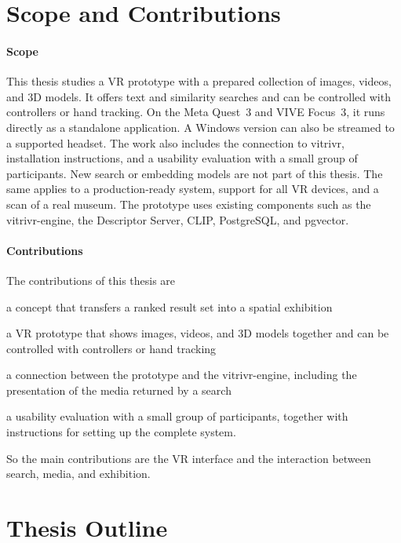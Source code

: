 \section{Scope and Contributions}
\label{sec:introduction-scope}

\paragraph{Scope} This thesis studies a VR prototype with a prepared collection of images, videos, and 3D models. It offers text and similarity searches and can be controlled with controllers or hand tracking. On the Meta Quest~3 and VIVE Focus~3, it runs directly as a standalone application. A Windows version can also be streamed to a supported headset. The work also includes the connection to vitrivr, installation instructions, and a usability evaluation with a small group of participants. New search or embedding models are not part of this thesis. The same applies to a production-ready system, support for all VR devices, and a scan of a real museum. The prototype uses existing components such as the vitrivr-engine, the Descriptor Server, CLIP, PostgreSQL, and pgvector.

\pagebreak
\paragraph{Contributions} The contributions of this thesis are
\begin{enumerate*}[label=(\roman*), itemjoin={{, }}, itemjoin*={{, and }}]
  \item a concept that transfers a ranked result set into a spatial exhibition
  \item a VR prototype that shows images, videos, and 3D models together and can be controlled with controllers or hand tracking
  \item a connection between the prototype and the vitrivr-engine, including the presentation of the media returned by a search
  \item a usability evaluation with a small group of participants, together with instructions for setting up the complete system.
\end{enumerate*}

So the main contributions are the VR interface and the interaction between search, media, and exhibition.

\section{Thesis Outline}
\label{sec:introduction-outline}

